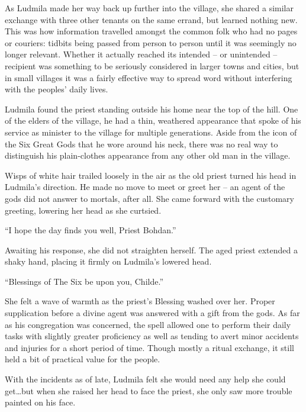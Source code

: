 As Ludmila made her way back up further into the village, she shared a similar exchange with three other tenants on the same errand, but learned nothing new. This was how information travelled amongst the common folk who had no pages or couriers: tidbits being passed from person to person until it was seemingly no longer relevant. Whether it actually reached its intended – or unintended – recipient was something to be seriously considered in larger towns and cities, but in small villages it was a fairly effective way to spread word without interfering with the peoples’ daily lives.

 

Ludmila found the priest standing outside his home near the top of the hill. One of the elders of the village, he had a thin, weathered appearance that spoke of his service as minister to the village for multiple generations. Aside from the icon of the Six Great Gods that he wore around his neck, there was no real way to distinguish his plain-clothes appearance from any other old man in the village.

 

Wisps of white hair trailed loosely in the air as the old priest turned his head in Ludmila’s direction. He made no move to meet or greet her – an agent of the gods did not answer to mortals, after all. She came forward with the customary greeting, lowering her head as she curtsied.

 

“I hope the day finds you well, Priest Bohdan.”

 

Awaiting his response, she did not straighten herself. The aged priest extended a shaky hand, placing it firmly on Ludmila's lowered head.

 

“Blessings of The Six be upon you, Childe.”

 

She felt a wave of warmth as the priest’s Blessing washed over her. Proper supplication before a divine agent was answered with a gift from the gods. As far as his congregation was concerned, the spell allowed one to perform their daily tasks with slightly greater proficiency as well as tending to avert minor accidents and injuries for a short period of time. Though mostly a ritual exchange, it still held a bit of practical value for the people.

 

With the incidents as of late, Ludmila felt she would need any help she could get…but when she raised her head to face the priest, she only saw more trouble painted on his face.

